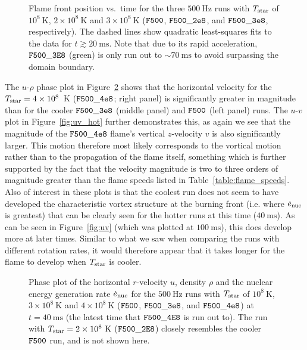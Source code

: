 \documentclass[preprint,times,tighten]{aastex63}
\begin{document}
\begin{figure}[t]
	\centering
	\caption{\label{fig:flame_speeds_2} Flame front position vs.\ time for the three $500~\mathrm{Hz}$ runs with
		$T_{\rm star}$ of $10^8~\mathrm{K}$, $2\times10^8~\mathrm{K}$ and $3\times10^8~\mathrm{K}$ ($\tt{F500}$, $\tt{F500\_2e8}$, and $\tt{F500\_3e8}$, respectively). The dashed lines show quadratic least-squares fits to the data
		for $t \gtrsim 20~\mathrm{ms}$. Note that due to its rapid acceleration, $\tt{F500\_3E8}$ 
		(green) is only run out to $\sim 70~\mathrm{ms}$ to avoid surpassing the domain boundary.}
\end{figure}

The $u$-$\rho$ phase plot in Figure~\ref{fig:urho_hot} shows that the horizontal velocity for the $T_{\rm star} = 4\times10^8$~K ($\tt{F500\_4e8}$; right panel) is significantly greater in magnitude than for the cooler $\tt{F500\_3e8}$ (middle panel) and $\tt{F500}$ (left panel) runs. The $u$-$v$ plot in Figure~\ref{fig:uv_hot} further demonstrates this, as again we see that the magnitude of the $\tt{F500\_4e8}$ flame's vertical $z$-velocity $v$ is also significantly larger. This motion therefore most likely corresponds to the vortical motion rather than to the propagation of the flame itself, something which is further supported by the fact that the velocity magnitude is two to three orders of magnitude greater than the flame speeds listed in Table~\ref{table:flame_speeds}. Also of interest in these plots is that the coolest run does not seem to have developed the characteristic vortex structure at the burning front (i.e. where $\dot{e}_{\rm nuc}$ is greatest) that can be clearly seen for the hotter runs at this time ($40~\mathrm{ms}$). As can be seen in Figure~\ref{fig:uv} (which was plotted at $100~\mathrm{ms}$), this does develop more at later times. Similar to what we saw when comparing the runs with different rotation rates, it would therefore appear that it takes longer for the flame to develop when $T_{\rm star}$ is cooler. 

\begin{figure}[t]
    \centering
    \caption{\label{fig:urho_hot}Phase plot of the horizontal $r$-velocity $u$, density $\rho$ and the nuclear energy generation rate $\dot{e}_{\rm nuc}$ for the $500~\mathrm{Hz}$ runs with $T_{\rm star}$ of $10^8~\mathrm{K}$, $3\times10^8~\mathrm{K}$ and $4\times10^8~\mathrm{K}$ ($\tt{F500}$, $\tt{F500\_3e8}$, and $\tt{F500\_4e8}$) at $t = 40~\mathrm{ms}$ (the latest time that $\tt{F500\_4E8}$ is run out to). The run with $T_{\rm star} = 2\times10^8~\mathrm{K}$ ($\tt{F500\_2E8}$) closely resembles the cooler $\tt{F500}$ run, and is not shown here.}
\end{figure}
\end{document}
